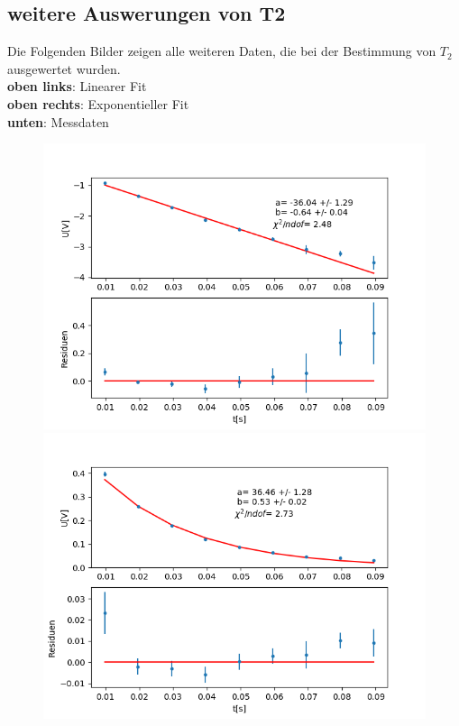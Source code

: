\documentclass[12pt,a4paper]{article}
\begin{document}
\subsection{weitere Auswerungen von T2}
Die Folgenden Bilder zeigen alle weiteren Daten, die bei der Bestimmung von $T_2$ ausgewertet wurden.\\
\textbf{oben links}: Linearer Fit\\
\textbf{oben rechts}: Exponentieller Fit\\
\textbf{unten}: Messdaten\\
\begin{figure}[H]
\centering
\includegraphics[scale=0.5]{Bilder/T2Anhang/T2log5.png}
\includegraphics[scale=0.5]{Bilder/T2Anhang/T2exp5.png}

\end{figure}
\end{document}
